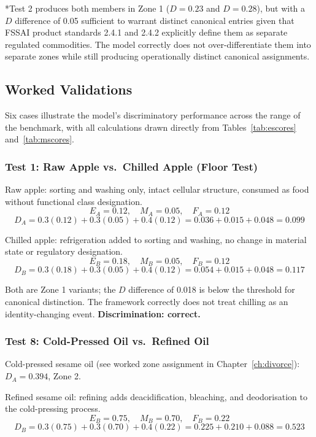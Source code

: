 \documentclass[12pt,a3paper]{article}
\begin{document}
\medskip
\noindent\small{*Test 2 produces both members in Zone 1 ($D = 0.23$ and $D = 0.28$), but with a $D$ difference of 0.05 sufficient to warrant distinct canonical entries given that FSSAI product standards 2.4.1 and 2.4.2 explicitly define them as separate regulated commodities. The model correctly does not over-differentiate them into separate zones while still producing operationally distinct canonical assignments.}

\subsection{Worked Validations}

Six cases illustrate the model's discriminatory performance across the range of the benchmark, with all calculations drawn directly from Tables~\ref{tab:escores} and~\ref{tab:mscores}.

\subsubsection{Test 1: Raw Apple vs.\ Chilled Apple (Floor Test)}

Raw apple: sorting and washing only, intact cellular structure, consumed as food without functional class designation.
$$E_A = 0.12,\quad M_A = 0.05,\quad F_A = 0.12$$
$$D_A = 0.3(0.12) + 0.3(0.05) + 0.4(0.12) = 0.036 + 0.015 + 0.048 = \mathbf{0.099}$$

Chilled apple: refrigeration added to sorting and washing, no change in material state or regulatory designation.
$$E_B = 0.18,\quad M_B = 0.05,\quad F_B = 0.12$$
$$D_B = 0.3(0.18) + 0.3(0.05) + 0.4(0.12) = 0.054 + 0.015 + 0.048 = \mathbf{0.117}$$

Both are Zone 1 variants; the $D$ difference of 0.018 is below the threshold for canonical distinction. The framework correctly does not treat chilling as an identity-changing event. \textbf{Discrimination: correct.}

\subsubsection{Test 8: Cold-Pressed Oil vs.\ Refined Oil}

Cold-pressed sesame oil (see worked zone assignment in Chapter~\ref{ch:divorce}): $D_A = 0.394$, Zone 2.

Refined sesame oil: refining adds deacidification, bleaching, and deodorisation to the cold-pressing process.
$$E_B = 0.75,\quad M_B = 0.70,\quad F_B = 0.22$$
$$D_B = 0.3(0.75) + 0.3(0.70) + 0.4(0.22) = 0.225 + 0.210 + 0.088 = \mathbf{0.523}$$
\end{document}
